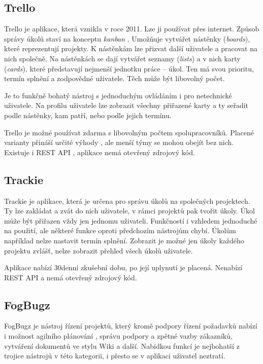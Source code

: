 \documentclass[thesis=B,czech]{FITthesis}[2012/06/26]
\begin{document}
		\subsection{Trello}
			Trello \cite{trello} je aplikace, která vznikla v roce 2011. Lze ji používat přes internet. Způsob správy úkolů staví na konceptu \textit{kanban} \cite{kanban}. Umožňuje vytvářet nástěnky (\textit{boards}), které reprezentují projekty. K nástěnkám lze přizvat další uživatele a pracovat na nich společně. Na nástěnkách se dají vytvářet seznamy (\textit{lists}) a v nich karty (\textit{cards}), které představují nejmenší jednotku práce -- úkol. Ten má svou prioritu, termín splnění a zodpovědné uživatele. Těch může být libovolný počet.
			
			Je to funkčně bohatý nástroj s jednoduchým ovládáním i pro netechnické uživatele. Na profilu uživatele lze zobrazit všechny přiřazené karty a ty seřadit podle nástěnky, kam patří, nebo podle jejich termínu. 
			
			Trello je možné používat zdarma s libovolným počtem spolupracovníků. Placené varianty přináší určité výhody \cite{trello-pricing}, ale menší týmy se mohou obejít bez nich. Existuje i REST API \cite{trello-api}, aplikace nemá otevřený zdrojový kód.
		
			
		\subsection{Trackie}
			Trackie \cite{trackie} je aplikace, která je určena pro správu úkolů na společných projektech. Ty lze zakládat a zvát do nich uživatele, v rámci projektů pak tvořit úkoly. Úkol může být přiřazen vždy jen jednomu uživateli. Funkčností i vzhledem jednoduché na použití, ale některé funkce oproti předchozím nástrojům chybí. Úkolům například nelze nastavit termín splnění. Zobrazit je možné jen úkoly každého projektu zvlášť, nelze zobrazit přehled všech úkolů uživatele. 
			
			Aplikace nabízí 30denní zkušební dobu, po její uplynutí je placená. Nenabízí REST API a nemá otevřený zdrojový kód.
			
		\subsection{FogBugz}
			FogBugz \cite{fogbugz} je nástroj řízení projektů, který kromě podpory řízení požadavků nabízí i možnost agilního plánování \cite{agile-planning}, správu podpory a zpětné vazby zákazníků, vytváření dokumentů ve stylu Wiki a další. Nabídkou funkcí je nejbohatší z trojice nástrojů v této kategorii, i přesto se v aplikaci uživatel neztratí. 
			
\end{document}
